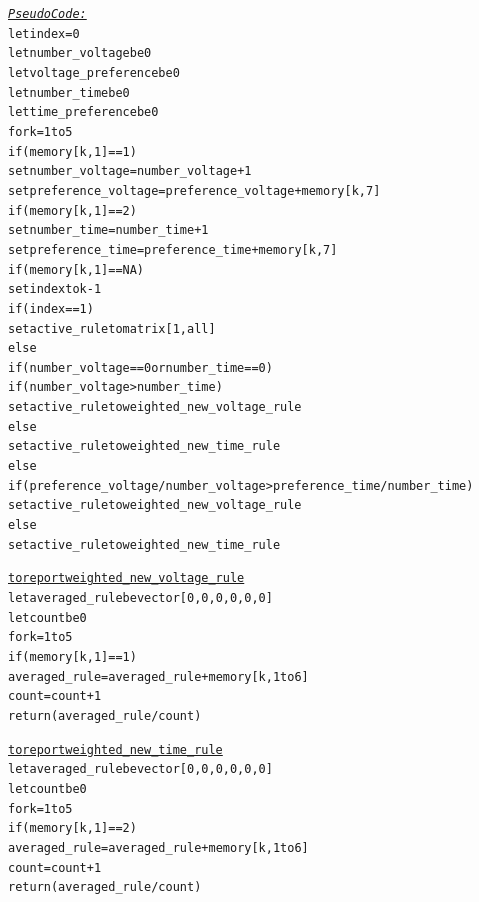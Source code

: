 \documentclass[a4paper]{article}
\begin{document}
\begin{alltt}
 \underline{\textit{Pseudo Code:}}
let index = 0
let number_voltage be 0
let voltage_preference be 0
let number_time be 0
let time_preference be 0 
for k = 1 to 5 
    if (memory[k,1] == 1)
        set number_voltage = number_voltage + 1 
        set preference_voltage = preference_voltage + memory[k,7]
    if (memory[k,1] == 2)
        set number_time = number_time + 1 
        set preference_time = preference_time + memory[k,7]
    if (memory[k,1]==NA)
        set index to k - 1
if (index ==1)
    set active_rule to matrix[1, all]
else
    if (number_voltage==0 or number_time==0)
        if (number_voltage > number_time)
            set active_rule to weighted_new_voltage_rule
        else 
            set active_rule to weighted_new_time_rule
    else 
        if (preference_voltage/number_voltage > preference_time/number_time)
            set active_rule to weighted_new_voltage_rule
        else 
            set active_rule to weighted_new_time_rule

\underline{to report weighted_new_voltage_rule}
let averaged_rule be vector[0,0,0,0,0,0]
let count be 0
for k = 1 to 5 
    if (memory[k,1] == 1)
        averaged_rule = averaged_rule + memory[k, 1 to 6]
        count = count + 1 
return (averaged_rule  / count)

\underline{to report weighted_new_time_rule}
let averaged_rule be vector[0,0,0,0,0,0]
let count be 0
for k = 1 to 5 
    if (memory[k,1] == 2)
        averaged_rule = averaged_rule + memory[k, 1 to 6]
        count = count + 1 
return (averaged_rule  / count)
\end{alltt}
\end{document}
